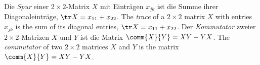 %
  {Die \emph{Spur} einer $2\times 2$-Matrix $X$ mit Einträgen $x_{jk}$ ist die
   Summe ihrer Diagonaleinträge, $\tr X = x_{11} + x_{22}$.}%
  {The \emph{trace} of a $2\times 2$ matrix $X$ with entries $x_{jk}$ is the
   sum of its diagonal entries, $\tr X = x_{11} + x_{22}$.}
%
  {Der \emph{Kommutator} zweier $2\times 2$-Matrizen $X$ und $Y$ ist die Matrix
   $\comm{X}{Y} = XY - YX$.}%
  {The \emph{commutator} of two $2\times 2$ matrices $X$ and $Y$ is the matrix
   $\comm{X}{Y} = XY - YX$.}
